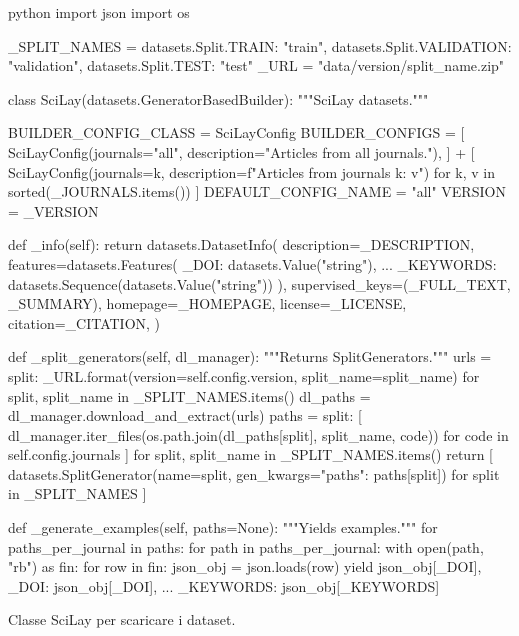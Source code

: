 \documentclass[12pt,a4paper,twoside,openright]{book}
\begin{document}
\begin{customcode}
\begin{mintedbox}{python}
import json
import os

_SPLIT_NAMES = {datasets.Split.TRAIN: "train", datasets.Split.VALIDATION: "validation", datasets.Split.TEST: "test"}
_URL = "data/{version}/{split_name}.zip"

class SciLay(datasets.GeneratorBasedBuilder):
    """SciLay datasets."""

    BUILDER_CONFIG_CLASS = SciLayConfig
    BUILDER_CONFIGS = [
        SciLayConfig(journals="all", description="Articles from all journals."),
    ] + [
        SciLayConfig(journals=k, description=f"Articles from journals {k}: {v}")
        for k, v in sorted(_JOURNALS.items())
    ]
    DEFAULT_CONFIG_NAME = "all"
    VERSION = _VERSION

    def _info(self):
        return datasets.DatasetInfo(
            description=_DESCRIPTION,
            features=datasets.Features({
                _DOI: datasets.Value("string"),
                ...
                _KEYWORDS: datasets.Sequence(datasets.Value("string"))
            }),
            supervised_keys=(_FULL_TEXT, _SUMMARY),
            homepage=_HOMEPAGE,
            license=_LICENSE,
            citation=_CITATION,
        )

    def _split_generators(self, dl_manager):
        """Returns SplitGenerators."""
        urls = {
            split: _URL.format(version=self.config.version, split_name=split_name)
            for split, split_name in _SPLIT_NAMES.items()
        }
        dl_paths = dl_manager.download_and_extract(urls)
        paths = {
            split: [
                dl_manager.iter_files(os.path.join(dl_paths[split], split_name, code)) for code in self.config.journals
            ]
            for split, split_name in _SPLIT_NAMES.items()
        }
        return [
            datasets.SplitGenerator(name=split, gen_kwargs={"paths": paths[split]})
            for split in _SPLIT_NAMES
        ]

    def _generate_examples(self, paths=None):
        """Yields examples."""
        for paths_per_journal in paths:
            for path in paths_per_journal:
                with open(path, "rb") as fin:
                    for row in fin:
                        json_obj = json.loads(row)
                        yield json_obj[_DOI], {
                            _DOI: json_obj[_DOI],
                            ...
                            _KEYWORDS: json_obj[_KEYWORDS]
                        }
\end{mintedbox}
\caption{Classe SciLay per scaricare i dataset.}
\label{lst:py-scilay}
\end{customcode}
\end{document}
